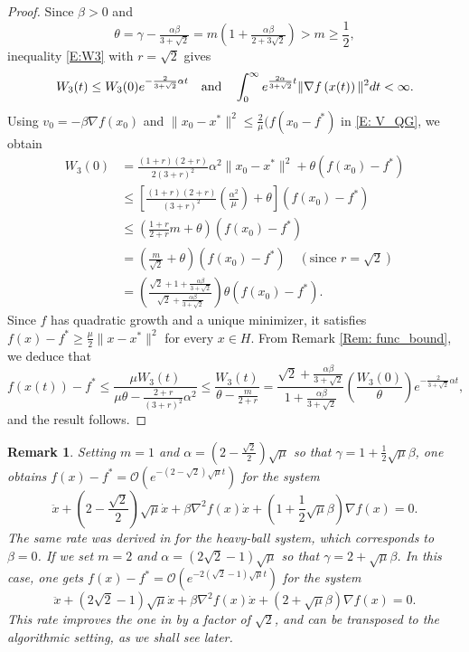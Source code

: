 \documentclass[pdflatex,sn-mathphys-num]{sn-jnl}
\theoremstyle{thmstyleone}
\theoremstyle{thmstyletwo}
\newtheorem{remark}{Remark}
\theoremstyle{thmstylethree}
\newcommand{\qbox}[1]{\quad\hbox{#1}\quad}
\begin{document}
\begin{proof}
Since $\beta>0$ and
$$\theta = \gamma - \tfrac{\alpha\beta}{3+\sqrt{2}} = m\left( 1 + \tfrac{\alpha\beta}{2+3\sqrt{2}} \right) > m \ge \frac{1}{2}, $$
inequality \eqref{E:W3} with $r=\sqrt{2}$ gives
$$ W_3(t) \le W_3(0)e^{-\frac{2}{3+\sqrt{2}}\alpha t} \qbox{and} \int_0^{\infty} e^{\frac{2\alpha}{3+\sqrt{2}}t}\| \nabla f\left(x(t)\right) \|^2 dt < \infty. $$
Using $v_0 = -\beta\nabla f(x_0)$ and $\|x_0-x^*\|^2\le \frac{2}{\mu}(f(x_0-f^*)$ in \eqref{E: V_QG}, we obtain 
\begin{align*}
W_3(0)
&= \frac{(1+r)(2+r)}{2(3+r)^2}\alpha^2 \| x_0 - x^* \|^2
  + \theta\left( f(x_0) - f^* \right) \\
&\le \left[ \frac{(1+r)(2+r)}{(3+r)^2} \left( \frac{\alpha^2}{\mu} \right) + \theta \right]\left( f(x_0) - f^* \right) \\
&\le 
   \left( \frac{1+r}{2+r}m + \theta \right) \left( f(x_0) - f^* \right) \\
&= \left( \frac{m}{\sqrt{2}} + \theta \right)\left( f(x_0) - f^* \right) \quad (\text{since }r=\sqrt{2}) \\
&= \left( \frac{\sqrt{2} + 1 + \frac{\alpha\beta}{3+\sqrt{2}} }{\sqrt{2} + \frac{\alpha\beta}{3+\sqrt{2}} }\right)\theta\left( f(x_0) - f^* \right).
\end{align*}
Since $f$ has quadratic growth and a unique minimizer, it satisfies $f(x) - f^*\ge \frac{\mu}{2}\|x-x^*\|^2$ for every $x\in H$. From Remark \ref{Rem: func_bound}, we deduce that 
$$ f\left(x(t) \right) - f^* 
\le \frac{\mu W_3(t)}{\mu\theta - \frac{2+r}{(3+r)^2}\alpha^2 }
\le \frac{W_3(t)}{\theta-\frac{m}{2+r} }
= \frac{\sqrt{2} + \frac{\alpha\beta}{3+\sqrt{2}} }{ 1 + \frac{\alpha\beta}{3+\sqrt{2}} } \left(\frac{W_3(0)}{\theta}\right) e^{-\frac{2}{3+\sqrt{2}}\alpha t}, $$
and the result follows.
\end{proof}


\begin{remark}
Setting $m=1$ and $\alpha= \left( 2 - \frac{\sqrt{2}}{2} \right)\sqrt{\mu}$ so that $\gamma = 1 + \frac{1}{2}\sqrt{\mu}\beta$, one obtains $f(x) - f^* = \mathcal{O}\left( e^{-(2-\sqrt{2})\sqrt{\mu}t} \right)$ for the system
$$ \ddot{x} + \left( 2 - \frac{\sqrt{2}}{2} \right)\sqrt{\mu}\dot{x} + \beta\nabla^2 f(x) \dot{x} + \left( 1 + \frac{1}{2}\sqrt{\mu}\beta \right) \nabla f(x) = 0.$$ 
The same rate was derived in \cite[Corollary 1]{Aujol_2023} for the heavy-ball system, which corresponds to $\beta = 0$. If we set $m=2$ and $\alpha=(2\sqrt{2}-1)\sqrt{\mu}$ so that $\gamma = 2 + \sqrt{\mu}\beta$. In this case, one gets $f(x) - f^* = \mathcal{O}\left( e^{-2(\sqrt{2}-1)\sqrt{\mu}t} \right)$ for the system
$$\ddot{x} + (2\sqrt{2}-1)\sqrt{\mu} \dot{x} + \beta\nabla^2 f(x) \dot{x} + (2+\sqrt{\mu}\beta) \nabla f(x) = 0.$$   
This rate improves the one in \cite[Corollary 1]{Aujol_2023} by a factor of $\sqrt{2}$, and can be transposed to the algorithmic setting, as we shall see later. 
\end{remark}
\end{document}
